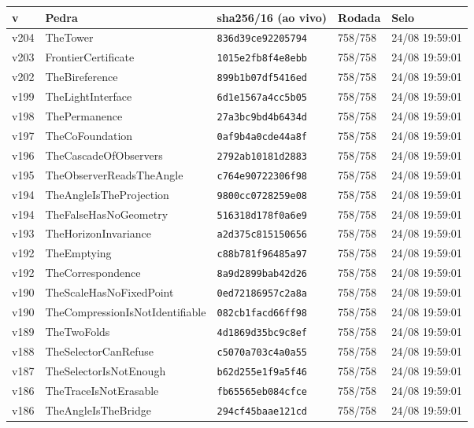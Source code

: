 \documentclass[11pt]{article}
\theoremstyle{definition}\newtheorem{deriv}{Derivação}
\begin{document}
{\small\begin{longtable}{@{}lllll@{}}\toprule v & Pedra & sha256/16 (ao vivo) & Rodada & Selo \\ \midrule\endhead 
v204 & TheTower & \texttt{836d39ce92205794} & 758/758 & 24/08 19:59:01 \\
v203 & FrontierCertificate & \texttt{1015e2fb8f4e8ebb} & 758/758 & 24/08 19:59:01 \\
v202 & TheBireference & \texttt{899b1b07df5416ed} & 758/758 & 24/08 19:59:01 \\
v199 & TheLightInterface & \texttt{6d1e1567a4cc5b05} & 758/758 & 24/08 19:59:01 \\
v198 & ThePermanence & \texttt{27a3bc9bd4b6434d} & 758/758 & 24/08 19:59:01 \\
v197 & TheCoFoundation & \texttt{0af9b4a0cde44a8f} & 758/758 & 24/08 19:59:01 \\
v196 & TheCascadeOfObservers & \texttt{2792ab10181d2883} & 758/758 & 24/08 19:59:01 \\
v195 & TheObserverReadsTheAngle & \texttt{c764e90722306f98} & 758/758 & 24/08 19:59:01 \\
v194 & TheAngleIsTheProjection & \texttt{9800cc0728259e08} & 758/758 & 24/08 19:59:01 \\
v194 & TheFalseHasNoGeometry & \texttt{516318d178f0a6e9} & 758/758 & 24/08 19:59:01 \\
v193 & TheHorizonInvariance & \texttt{a2d375c815150656} & 758/758 & 24/08 19:59:01 \\
v192 & TheEmptying & \texttt{c88b781f96485a97} & 758/758 & 24/08 19:59:01 \\
v192 & TheCorrespondence & \texttt{8a9d2899bab42d26} & 758/758 & 24/08 19:59:01 \\
v190 & TheScaleHasNoFixedPoint & \texttt{0ed72186957c2a8a} & 758/758 & 24/08 19:59:01 \\
v190 & TheCompressionIsNotIdentifiable & \texttt{082cb1facd66ff98} & 758/758 & 24/08 19:59:01 \\
v189 & TheTwoFolds & \texttt{4d1869d35bc9c8ef} & 758/758 & 24/08 19:59:01 \\
v188 & TheSelectorCanRefuse & \texttt{c5070a703c4a0a55} & 758/758 & 24/08 19:59:01 \\
v187 & TheSelectorIsNotEnough & \texttt{b62d255e1f9a5f46} & 758/758 & 24/08 19:59:01 \\
v186 & TheTraceIsNotErasable & \texttt{fb65565eb084cfce} & 758/758 & 24/08 19:59:01 \\
v186 & TheAngleIsTheBridge & \texttt{294cf45baae121cd} & 758/758 & 24/08 19:59:01 \\

\end{longtable}}
\end{document}
